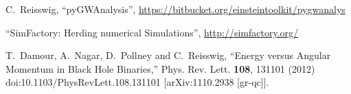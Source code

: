 \begin{thebibliography}{9}
C.~Reisswig,
``pyGWAnalysis'',
\url{https://bitbucket.org/einsteintoolkit/pygwanalys}

``SimFactory: Herding numerical Simulations'',
\url{http://simfactory.org/}

T.~Damour, A.~Nagar, D.~Pollney and C.~Reisswig,
``Energy versus Angular Momentum in Black Hole Binaries,''
Phys. Rev. Lett. \textbf{108}, 131101 (2012)
doi:10.1103/PhysRevLett.108.131101
[arXiv:1110.2938 [gr-qc]].

\end{thebibliography}



